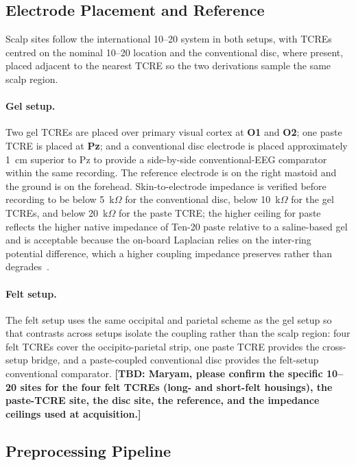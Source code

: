 \documentclass[10pt,a4paper]{article}
\newcommand{\TBD}[1]{{\color{red}\textbf{[TBD: #1]}}}
\begin{document}
\subsection{Electrode Placement and Reference}\label{sec:electrode_placement}

Scalp sites follow the international 10--20 system in both setups, with TCREs centred on the nominal 10--20 location and the conventional disc, where present, placed adjacent to the nearest TCRE so the two derivations sample the same scalp region.

\paragraph{Gel setup.} Two gel TCREs are placed over primary visual cortex at \textbf{O1} and \textbf{O2}; one paste TCRE is placed at \textbf{Pz}; and a conventional disc electrode is placed approximately 1~cm superior to Pz to provide a side-by-side conventional-EEG comparator within the same recording. The reference electrode is on the right mastoid and the ground is on the forehead. Skin-to-electrode impedance is verified before recording to be below 5~k$\Omega$ for the conventional disc, below 10~k$\Omega$ for the gel TCREs, and below 20~k$\Omega$ for the paste TCRE; the higher ceiling for paste reflects the higher native impedance of Ten-20 paste relative to a saline-based gel and is acceptable because the on-board Laplacian relies on the inter-ring potential difference, which a higher coupling impedance preserves rather than degrades~\cite{vincelli2024}.

\paragraph{Felt setup.} The felt setup uses the same occipital and parietal scheme as the gel setup so that contrasts across setups isolate the coupling rather than the scalp region: four felt TCREs cover the occipito-parietal strip, one paste TCRE provides the cross-setup bridge, and a paste-coupled conventional disc provides the felt-setup conventional comparator. \TBD{Maryam, please confirm the specific 10--20 sites for the four felt TCREs (long- and short-felt housings), the paste-TCRE site, the disc site, the reference, and the impedance ceilings used at acquisition.}

\subsection{Preprocessing Pipeline}
\end{document}
